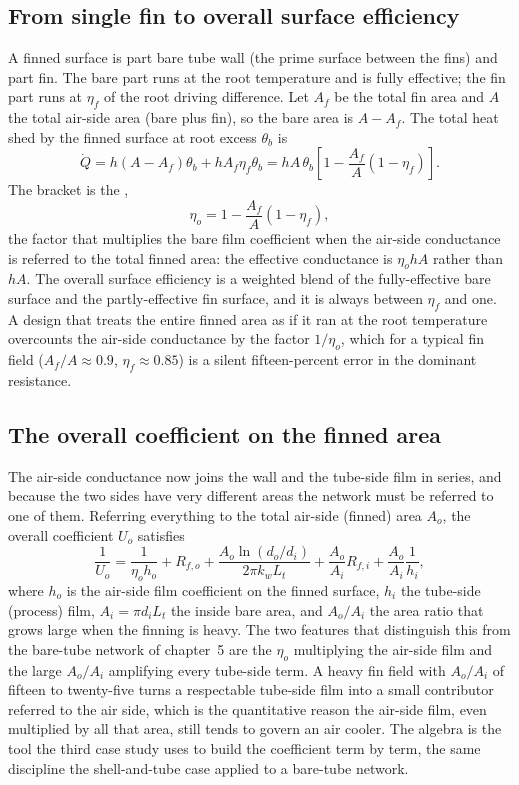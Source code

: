 

\subsection{From single fin to overall surface efficiency}

A finned surface is part bare tube wall (the prime surface between the fins) and
part fin. The bare part runs at the root temperature and is fully effective; the
fin part runs at $\eta_f$ of the root driving difference. Let $A_f$ be the total
fin area and $A$ the total air-side area (bare plus fin), so the bare area is
$A - A_f$. The total heat shed by the finned surface at root excess $\theta_b$ is
\[
\dot{Q} = h(A - A_f)\theta_b + h A_f \eta_f \theta_b
= h A\,\theta_b\left[1 - \frac{A_f}{A}(1 - \eta_f)\right].
\]
The bracket is the ,
\[
\eta_o = 1 - \frac{A_f}{A}(1 - \eta_f),
\]
the factor that multiplies the bare film coefficient when the air-side
conductance is referred to the total finned area: the effective conductance is
$\eta_o h A$ rather than $hA$. The overall surface efficiency is a weighted blend
of the fully-effective bare surface and the partly-effective fin surface, and it
is always between $\eta_f$ and one. A design that treats the entire finned area as
if it ran at the root temperature overcounts the air-side conductance by the
factor $1/\eta_o$, which for a typical fin field ($A_f/A \approx 0.9$,
$\eta_f \approx 0.85$) is a silent fifteen-percent error in the dominant
resistance.

\subsection{The overall coefficient on the finned area}

The air-side conductance now joins the wall and the tube-side film in series, and
because the two sides have very different areas the network must be referred to
one of them. Referring everything to the total air-side (finned) area $A_o$, the
overall coefficient $U_o$ satisfies
\[
\frac{1}{U_o} = \frac{1}{\eta_o h_o}
+ R_{f,o}
+ \frac{A_o \ln(d_o/d_i)}{2\pi k_w L_t}
+ \frac{A_o}{A_i} R_{f,i}
+ \frac{A_o}{A_i}\frac{1}{h_i},
\]
where $h_o$ is the air-side film coefficient on the finned surface, $h_i$ the
tube-side (process) film, $A_i = \pi d_i L_t$ the inside bare area, and
$A_o/A_i$ the area ratio that grows large when the finning is heavy. The two
features that distinguish this from the bare-tube network of chapter~5 are the
$\eta_o$ multiplying the air-side film and the large $A_o/A_i$ amplifying every
tube-side term. A heavy fin field with $A_o/A_i$ of fifteen to twenty-five turns a
respectable tube-side film into a small contributor referred to the air side,
which is the quantitative reason the air-side film, even multiplied by all that
area, still tends to govern an air cooler. The algebra is the tool the third case
study uses to build the coefficient term by term, the same discipline the
shell-and-tube case applied to a bare-tube network.

